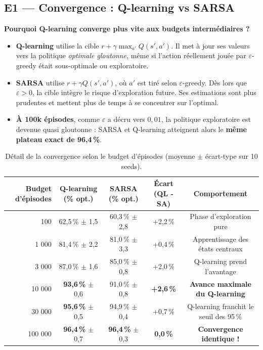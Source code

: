 \documentclass[11pt,a4paper]{article}
\begin{document}
\subsection{E1 — Convergence : Q-learning vs SARSA}

\begin{defbox}
\textbf{Pourquoi Q-learning converge plus vite aux budgets intermédiaires ?}
\begin{itemize}[nosep]
  \item \textbf{Q-learning} utilise la cible $r + \gamma \max_{a'} Q(s', a')$. Il met à jour ses valeurs vers la politique \textit{optimale gloutonne}, même si l'action réellement jouée par $\varepsilon$-greedy était sous-optimale ou exploratoire.
  \item \textbf{SARSA} utilise $r + \gamma Q(s', a')$, où $a'$ est tiré selon $\varepsilon$-greedy. Dès lors que $\varepsilon > 0$, la cible intègre le risque d'exploration future. Ses estimations sont plus prudentes et mettent plus de temps à se concentrer sur l'optimal.
  \item \textbf{À 100k épisodes}, comme $\varepsilon$ a décru vers $0{,}01$, la politique exploratoire est devenue quasi gloutonne : SARSA et Q-learning atteignent alors le \textbf{même plateau exact de 96,4\,\%}.
\end{itemize}
\end{defbox}

\begin{table}[h!]
\centering
\small
\begin{tabular}{rcccc}
\toprule
\textbf{Budget d'épisodes} & \textbf{Q-learning (\% opt.)} & \textbf{SARSA (\% opt.)} & \textbf{Écart (QL - SA)} & \textbf{Comportement} \\
\midrule
100 & 62,5\,\% $\pm$ 1,5 & 60,3\,\% $\pm$ 2,8 & +2,2\,\% & Phase d'exploration pure \\
1 000 & 81,4\,\% $\pm$ 2,2 & 81,0\,\% $\pm$ 3,3 & +0,4\,\% & Apprentissage des états centraux \\
3 000 & 87,0\,\% $\pm$ 1,6 & 85,0\,\% $\pm$ 0,8 & +2,0\,\% & Q-learning prend l'avantage \\
10 000 & \textbf{93,6\,\%} $\pm$ 0,6 & 91,0\,\% $\pm$ 0,8 & \textbf{+2,6\,\%} & \textbf{Avance maximale du Q-learning} \\
30 000 & \textbf{95,6\,\%} $\pm$ 0,5 & 94,9\,\% $\pm$ 0,4 & +0,7\,\% & Q-learning franchit le seuil des 95\,\% \\
100 000 & \textbf{96,4\,\%} $\pm$ 0,7 & \textbf{96,4\,\%} $\pm$ 0,3 & \textbf{0,0\,\%} & \textbf{Convergence identique !} \\
\bottomrule
\end{tabular}
\caption{Détail de la convergence selon le budget d'épisodes (moyenne $\pm$ écart-type sur 10 seeds).}
\label{tab:e1_details}
\end{table}
\end{document}
